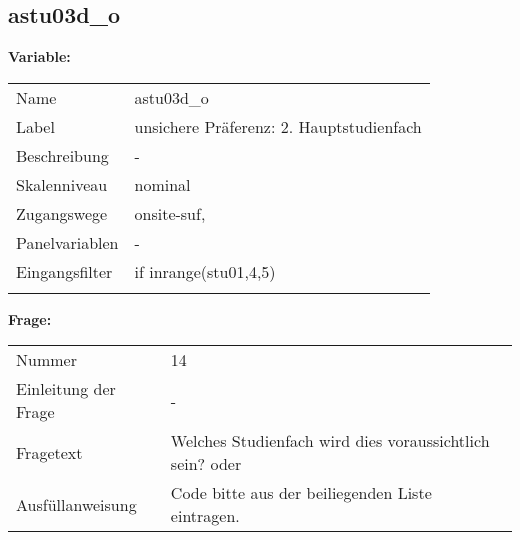 	
	
	\subsection{astu03d\_o}
	\label{subSection:astu03d_o}

	\noindent\textbf{Variable:}\\
		\begin{tabular}{lL{11.3cm}}
			\label{tableVariable:astu03d_o}
			Name & astu03d\_o \\
			Label & unsichere Präferenz: 2. Hauptstudienfach  \\
			Beschreibung & - \\
			Skalenniveau & nominal \\
			Zugangswege &
				onsite-suf,
 \\
			Panelvariablen & -
			 \\
			Eingangsfilter & if inrange(stu01,4,5) \\
 \\
		\end{tabular}

		\vspace*{1 cm}
		\noindent\textbf{Frage:}\\
		\begin{tabular}{lL{11.3cm}}
			\label{tableQuestion:astu03d_o}
			Nummer & 14 \\
			Einleitung der Frage & - \\
			Fragetext & Welches Studienfach wird dies voraussichtlich sein?
oder \\
			Ausfüllanweisung & Code bitte aus der beiliegenden Liste eintragen. \\
		\end{tabular}





